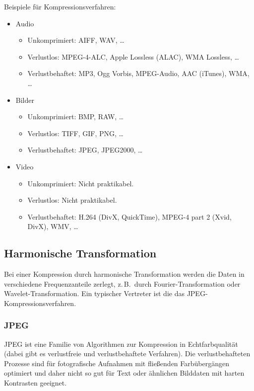 \documentclass[a4paper, 11pt, accentcolor = tud3b]{tudreport}
\newcommand{\zB}{z.\,B.~}
\begin{document}
			Beispiele für Kompressionsverfahren:
			\begin{itemize}
				\item Audio
					\begin{itemize}
						\item Unkomprimiert: AIFF, WAV, \dots
						\item Verlustlos: MPEG-4-ALC, Apple Lossless (ALAC), WMA Lossless, \dots
						\item Verlustbehaftet: MP3, Ogg Vorbis, MPEG-Audio, AAC (iTunes), WMA, \dots
					\end{itemize}
				\item Bilder
					\begin{itemize}
						\item Unkomprimiert: BMP, RAW, \dots
						\item Verlustlos: TIFF, GIF, PNG, \dots
						\item Verlustbehaftet: JPEG, JPEG2000, \dots
					\end{itemize}
				\item Video
					\begin{itemize}
						\item Unkomprimiert: Nicht praktikabel.
						\item Verlustlos: Nicht praktikabel.
						\item Verlustbehaftet: H.264 (DivX, QuickTime), MPEG-4 part 2 (Xvid, DivX), WMV, \dots
					\end{itemize}
			\end{itemize}

			\subsection{Harmonische Transformation}
				Bei einer Kompression durch harmonische Transformation werden die Daten in verschiedene Frequenzanteile zerlegt, \zB durch Fourier-Transformation oder Wavelet-Transformation. Ein typischer Vertreter ist die das JPEG-Kompressionsverfahren.

				\subsubsection{JPEG}
					JPEG ist eine Familie von Algorithmen zur Kompression in Echtfarbqualität (dabei gibt es verlustfreie und verlustbehaftete Verfahren). Die verlustbehafteten Prozesse sind für fotografische Aufnahmen mit fließenden Farbübergängen optimiert und daher nicht so gut für Text oder ähnlichen Bilddaten mit harten Kontrasten geeignet.
					
\end{document}
